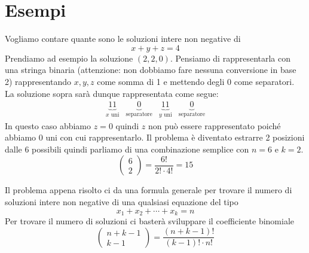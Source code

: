\section{Esempi}

\begin{example}
	Vogliamo contare quante sono le soluzioni intere non negative di
	\begin{equation*}
		x + y + z = 4
	\end{equation*}
	Prendiamo ad esempio la soluzione $(2, 2, 0)$.
	Pensiamo di rappresentarla con una stringa binaria (attenzione: non dobbiamo fare nessuna
	conversione in base 2) rappresentando $x, y, z$ come somma di 1 e mettendo degli 0 come
	separatori. La soluzione sopra sar\`a dunque rappresentata come segue:
	\begin{equation*}
		\begin{array}{cccc}
			\underbrace{11}_{\text{$x$ uni}}   &
			\underbrace{0}_{\text{separatore}} &
			\underbrace{11}_{\text{$y$ uni}}   &
			\underbrace{0}_{\text{separatore}}
		\end{array}
	\end{equation*}
	In questo caso abbiamo $z = 0$ quindi $z$ non pu\`o essere rappresentato poich\'e abbiamo
	0 uni con cui rappresentarlo.
	Il problema \`e diventato estrarre 2 posizioni dalle 6 possibili quindi parliamo di una
	combinazione semplice con $n = 6$ e $k = 2$.
	\begin{equation*}
		\begin{pmatrix}
			6 \\ 2
		\end{pmatrix} =
		\frac{6!}{2! \cdot 4!} = 15
	\end{equation*}
\end{example}

Il problema appena risolto ci da una formula generale per trovare il numero di soluzioni
intere non negative di una qualsiasi equazione del tipo
\begin{equation*}
	x_1 + x_2 + \cdots + x_k = n
\end{equation*}
Per trovare il numero di soluzioni ci baster\`a sviluppare il coefficiente binomiale
\begin{equation*}
	\begin{pmatrix}
		n + k - 1 \\ k - 1
	\end{pmatrix} =
	\frac{(n + k - 1)!}{(k - 1)! \cdot n!}
\end{equation*}